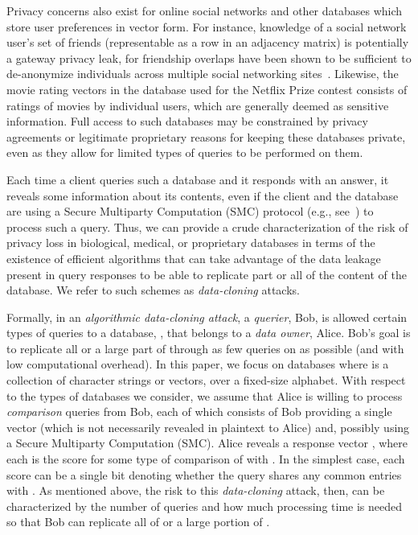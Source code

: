 \documentclass{article}
\begin{document}
Privacy concerns also exist for online social networks and other databases 
which store user preferences in vector form.  For instance, knowledge of a 
social network user's set of friends (representable as a row in an adjacency matrix)
is potentially a gateway privacy leak, for friendship overlaps have been shown to  
be sufficient to de-anonymize individuals across multiple social
networking sites~\cite{nv-dsn-09}.  Likewise, the movie rating vectors in the 
database used for the Netflix Prize contest consists of ratings of movies by 
individual users, which are generally deemed as sensitive information.
Full access to such databases may be constrained by privacy
agreements or legitimate proprietary reasons for keeping these databases
private, even as they allow for limited types of queries to be performed on them.

Each time a client queries such a database and it responds 
with an answer, it reveals some information about
its contents, even if the client and the database are using
a Secure Multiparty Computation (SMC) protocol (e.g., 
see~\cite{akd-spsc-03,bnp-fssmp-08,dfknt-uscfm-06,jks-tppgc-08,
jmcs-sddli-08,spol-tpdp-06,ss-ppsip-07,y-psc-82})
to process such a query.
Thus, we can provide a crude characterization of 
the risk of privacy loss in biological, medical, or proprietary databases
in terms of the existence of efficient algorithms that can take advantage 
of the data leakage present in query responses to
be able to replicate part or all of the content of the database.
We refer to such schemes as \emph{data-cloning} attacks.


Formally, in an \emph{algorithmic data-cloning attack}, a \emph{querier}, Bob, is
allowed certain types of queries to a database, , that belongs
to a \emph{data owner}, Alice. Bob's goal is to replicate all or a large part 
of  through as few  
queries on  as possible (and with low computational overhead).
In this paper, we focus on databases where  is a
collection  of character strings or vectors,
over a fixed-size alphabet.  With respect to the types of databases we consider,
we assume that Alice is willing to process \emph{comparison}
queries from Bob, each of which consists of 
Bob providing a single vector  (which is not
necessarily revealed in plaintext to Alice) and, 
possibly using a Secure Multiparty Computation (SMC).
Alice reveals a response vector , where 
each  is the score for some type of comparison of  with .
In the simplest case, each score  can be a single bit denoting 
whether the query  shares any common entries with .
As mentioned above, the risk to this \emph{data-cloning} attack, then,
can be characterized by the number of queries 
and how much processing time is needed so that 
Bob can replicate all of  or a large portion of .
\end{document}
